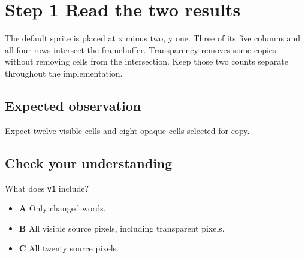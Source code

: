 \section{Step 1 Read the two results}\label{blit-s01}

The default sprite is placed at x minus two, y one. Three of its five columns and all four rows intersect the framebuffer. Transparency removes some copies without removing cells from the intersection. Keep those two counts separate throughout the implementation.


\subsection{Expected observation}
Expect twelve visible cells and eight opaque cells selected for copy.

\subsection{Check your understanding}
What does \texttt{v1} include?

\begin{itemize}
  \item \textbf{A} Only changed words.
  \item \textbf{B} All visible source pixels, including transparent pixels.
  \item \textbf{C} All twenty source pixels.
\end{itemize}
